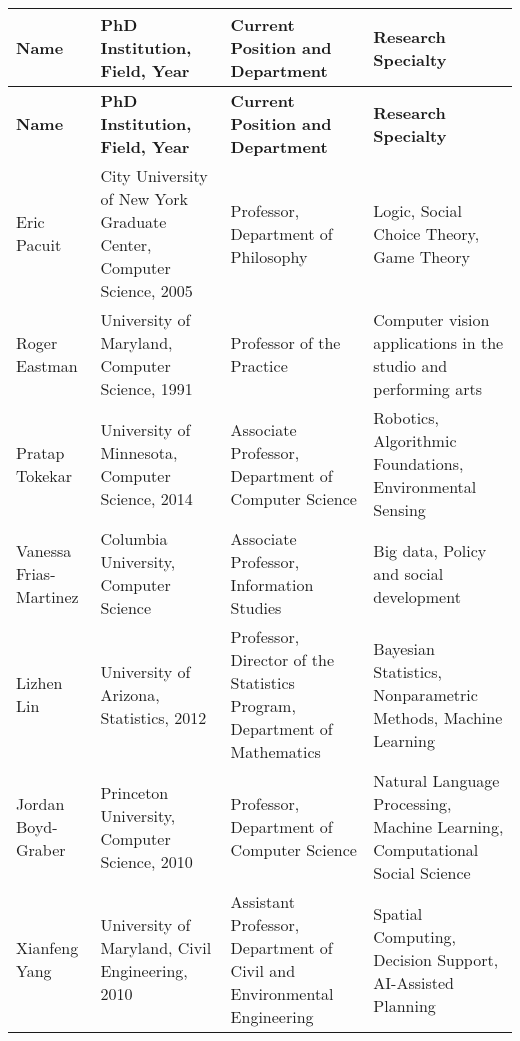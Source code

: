 


\begin{longtable}{p{2cm}p{3cm}p{4cm}p{4cm}}
\hline
\textbf{Name} & \textbf{PhD Institution, Field, Year} & \textbf{Current Position and Department} & \textbf{Research Specialty} \\
\hline
\endfirsthead
\hline
\textbf{Name} & \textbf{PhD Institution, Field, Year} & \textbf{Current Position and Department} & \textbf{Research Specialty} \\
\hline
\endhead
\hline
\endfoot
\hline
\endlastfoot
Eric Pacuit & City University of New York Graduate Center, Computer Science, 2005 & Professor, Department of Philosophy & Logic, Social Choice Theory, Game Theory \\
\hline
Roger Eastman & University of Maryland, Computer Science, 1991 & Professor of the Practice & Computer vision applications in the studio and performing arts \\
\hline
Pratap Tokekar & University of Minnesota, Computer Science, 2014 & Associate Professor, Department of Computer Science & Robotics, Algorithmic Foundations, Environmental Sensing \\
\hline
Vanessa Frias-Martinez & Columbia University, Computer Science & Associate Professor, Information Studies & Big data, Policy and social development \\
\hline
Lizhen Lin & University of Arizona, Statistics, 2012 & Professor, Director of the Statistics Program, Department of Mathematics & Bayesian Statistics, Nonparametric Methods, Machine Learning \\
\hline
Jordan Boyd-Graber & Princeton University, Computer Science, 2010 &  Professor, Department of Computer Science & Natural Language Processing, Machine Learning, Computational Social Science \\
\hline
Xianfeng Yang & University of Maryland, Civil Engineering, 2010 & Assistant Professor, Department of Civil and Environmental
Engineering & Spatial Computing, Decision Support, AI-Assisted Planning \\
\end{longtable}



